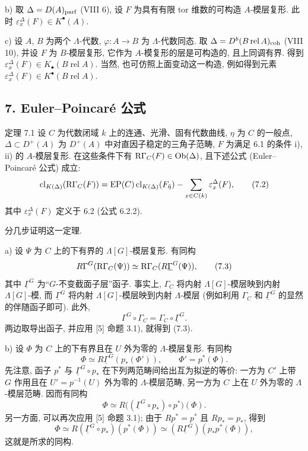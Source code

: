 b) 取 $\Delta=D(A)_{\mathrm{parf}}$ (VIII 6), 设 $F$ 为具有有限 tor 维数的可构造 $A$-模层复形. 此时 $\varepsilon_x^\Delta(F)\in K^{\bullet}(A)$.

c) 设 $A$, $B$ 为两个 $\Lambda$-代数, $\varphi:A\to B$ 为 $\Lambda$-代数同态. 取 $\Delta=D^b(B\operatorname{ rel }A)_{\mathrm{coh}}$ (VIII 10), 并设 $F$ 为 $B$-模层复形, 它作为 $A$-模复形的层是可构造的, 且上同调有界. 得到 $\varepsilon_x^\Delta(F)\in K_\bullet(B\operatorname{ rel }A)$. 当然, 也可仿照上面变动这一构造, 例如得到元素 $\varepsilon_x^\Delta(F)\in K^{\bullet}(B\operatorname{ rel }A)$.

\subsection*{7. Euler--Poincaré 公式}

\begin{statement}{定理 7.1}
设 $C$ 为代数闭域 $k$ 上的连通、光滑、固有代数曲线, $\eta$ 为 $C$ 的一般点, $\Delta\subset D^+(A)$ 为 $D^+(A)$ 中对直因子稳定的三角子范畴, $F$ 为满足 6.1 的条件 i), ii) 的 $A$-模层复形. 在这些条件下有 $\mathrm R\Gamma_C(F)\in\operatorname{Ob}(\Delta)$, 且下述公式 (Euler--Poincaré 公式) 成立:
\[
\operatorname{cl}_{K(\Delta)}(\mathrm R\Gamma_C(F))
=
\operatorname{EP}(C)\operatorname{cl}_{K(\Delta)}(F_{\bar\eta})
-\sum_{x\in C(k)}\varepsilon_x^\Delta(F),
\tag{7.2}
\]
其中 $\varepsilon_x^\Delta(F)$ 定义于 6.2 (公式 6.2.2).
\end{statement}

分几步证明这一定理.

a) 设 $\Psi$ 为 $C$ 上的下有界的 $\Lambda[G]$-模层复形. 有同构
\[
R\Gamma^G(\mathrm R\Gamma_C(\Psi))\simeq\mathrm R\Gamma_C(R\underline{\Gamma}^G(\Psi)),
\tag{7.3}
\]
其中 $\underline{\Gamma}^G$ 为“$G$-不变截面子层”函子. 事实上, $\Gamma_C$ 将内射 $\Lambda[G]$-模层映到内射 $\Lambda[G]$-模, 而 $\underline{\Gamma}^G$ 将内射 $\Lambda[G]$-模层映到内射 $\Lambda$-模层 (例如利用 $\Gamma_C$ 和 $\underline{\Gamma}^G$ 的显然的伴随函子即可). 此外,
\[
\Gamma^G\circ\Gamma_C=\Gamma_C\circ\underline{\Gamma}^G.
\]
两边取导出函子, 并应用 [5] 命题 3.1), 就得到 (7.3).

b) 设 $\Phi$ 为 $C$ 上的下有界且在 $U$ 外为零的 $\Lambda$-模层复形. 有同构
\[
\Phi\simeq R\underline{\Gamma}^G(p_*(\Phi')),
\qquad \Phi'=p^*(\Phi).
\tag{7.4}
\]
先注意, 函子 $p^*$ 与 $\underline{\Gamma}^G\circ p_*$ 在下列两范畴间给出互为拟逆的等价: 一方为 $C'$ 上带 $G$ 作用且在 $U'=p^{-1}(U)$ 外为零的 $\Lambda$-模层范畴, 另一方为 $C$ 上在 $U$ 外为零的 $\Lambda$-模层范畴. 因而有同构
\[
\Phi\simeq R\bigl((\underline{\Gamma}^G\circ p_*)\circ p^*\bigr)(\Phi).
\]
另一方面, 可以再次应用 [5] 命题 3.1); 由于 $Rp^*=p^*$ 且 $Rp_*=p_*$, 得到
\[
\Phi\simeq R(\underline{\Gamma}^G\circ p_*)(p^*(\Phi))
\simeq (R\underline{\Gamma}^G)(p_*p^*(\Phi)),
\]
这就是所求的同构.

